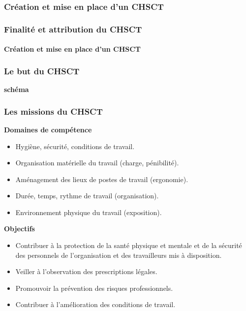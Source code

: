 \documentclass{beamer}
\begin{document}
\begin{frame}
\frametitle{Création et mise en place d'un CHSCT}

\end{frame}

\begin{frame}
\frametitle{Finalité et attribution du CHSCT}
\framesubtitle{Création et mise en place d'un CHSCT}

\end{frame}


\begin{frame}
\frametitle{Le but du CHSCT}

\textbf{schéma}
\end{frame}

\begin{frame}
\frametitle{Les missions du CHSCT}

\textbf{Domaines de compétence}

\begin{itemize}
        \item Hygiène, sécurité, conditions de travail. 
 
        \item Organisation matérielle du travail (charge, pénibilité).  
 
        \item Aménagement des lieux de postes de travail (ergonomie).  
 
        \item Durée, temps, rythme de travail (organisation). 
 
        \item Environnement physique du travail (exposition).
\end{itemize}

\textbf{Objectifs}

\begin{itemize}
        \item Contribuer à la protection de la santé physique et mentale et de la sécurité des personnels de l'organisation et des travailleurs mis à disposition.

        \item Veiller à l'observation des prescriptions légales. 

        \item Promouvoir la prévention des risques professionnels.

         \item Contribuer à l'amélioration des conditions de travail.
\end{itemize}
\end{frame}
\end{document}

